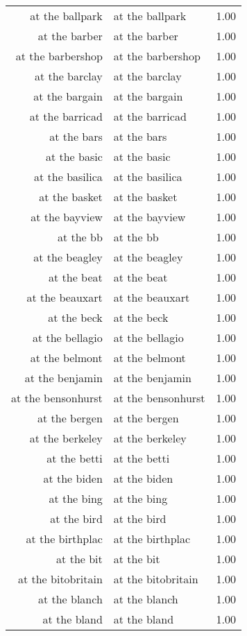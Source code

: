 \begin{table}[ht]
\begin{tabular}{rlr}
  at the ballpark & at the ballpark & 1.00 \\ 
  at the barber & at the barber & 1.00 \\ 
  at the barbershop & at the barbershop & 1.00 \\ 
  at the barclay & at the barclay & 1.00 \\ 
  at the bargain & at the bargain & 1.00 \\ 
  at the barricad & at the barricad & 1.00 \\ 
  at the bars & at the bars & 1.00 \\ 
  at the basic & at the basic & 1.00 \\ 
  at the basilica & at the basilica & 1.00 \\ 
  at the basket & at the basket & 1.00 \\ 
  at the bayview & at the bayview & 1.00 \\ 
  at the bb & at the bb & 1.00 \\ 
  at the beagley & at the beagley & 1.00 \\ 
  at the beat & at the beat & 1.00 \\ 
  at the beauxart & at the beauxart & 1.00 \\ 
  at the beck & at the beck & 1.00 \\ 
  at the bellagio & at the bellagio & 1.00 \\ 
  at the belmont & at the belmont & 1.00 \\ 
  at the benjamin & at the benjamin & 1.00 \\ 
  at the bensonhurst & at the bensonhurst & 1.00 \\ 
  at the bergen & at the bergen & 1.00 \\ 
  at the berkeley & at the berkeley & 1.00 \\ 
  at the betti & at the betti & 1.00 \\ 
  at the biden & at the biden & 1.00 \\ 
  at the bing & at the bing & 1.00 \\ 
  at the bird & at the bird & 1.00 \\ 
  at the birthplac & at the birthplac & 1.00 \\ 
  at the bit & at the bit & 1.00 \\ 
  at the bitobritain & at the bitobritain & 1.00 \\ 
  at the blanch & at the blanch & 1.00 \\ 
  at the bland & at the bland & 1.00 \\ 

\end{tabular}
\end{table}
